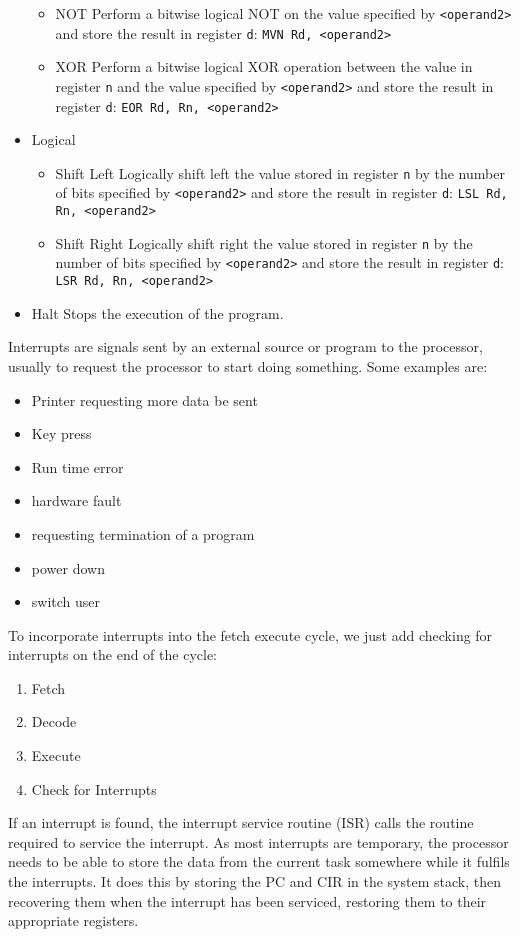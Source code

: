 \begin{itemize}
\begin{itemize}
      \item NOT
        \subitem Perform a bitwise logical NOT on the value specified by \verb|<operand2>| and store the result in register \verb|d|: \verb|MVN Rd, <operand2>|
      \item XOR
        \subitem Perform a bitwise logical XOR operation between the value in register \verb|n| and the value specified by \verb|<operand2>| and store the result in register \verb|d|: \verb|EOR Rd, Rn, <operand2>|
    \end{itemize}
    \item Logical
    \begin{itemize}
      \setlength{\itemsep}{0em}
      \item Shift Left
        \subitem Logically shift left the value stored in register \verb|n| by the number of bits specified by \verb|<operand2>| and store the result in register \verb|d|: \verb|LSL Rd, Rn, <operand2>|
      \item Shift Right
        \subitem Logically shift right the value stored in register \verb|n| by the number of bits specified by \verb|<operand2>| and store the result in register \verb|d|: \verb|LSR Rd, Rn, <operand2>|
    \end{itemize}
    \item Halt
      \subitem Stops the execution of the program.
  \end{itemize}
  Interrupts are signals sent by an external source or program to the processor, usually to request the processor to start doing something. Some examples are:
  \begin{itemize}
  	\item Printer requesting more data be sent
  	\item Key press
  	\item Run time error
  	\item hardware fault
  	\item requesting termination of a program
  	\item power down
  	\item switch user
  \end{itemize}
  
  To incorporate interrupts into the fetch execute cycle, we just add checking for interrupts on the end of the cycle:
  \begin{enumerate}
  	\item Fetch
  	\item Decode
  	\item Execute
  	\item Check for Interrupts
  \end{enumerate}
  If an interrupt is found, the interrupt service routine (ISR) calls the routine required to service the interrupt. As most interrupts are temporary, the processor needs to be able to store the data from the current task somewhere while it fulfils the interrupts. It does this by storing the PC and CIR in the system stack, then recovering them when the interrupt has been serviced, restoring them to their appropriate registers.
  
